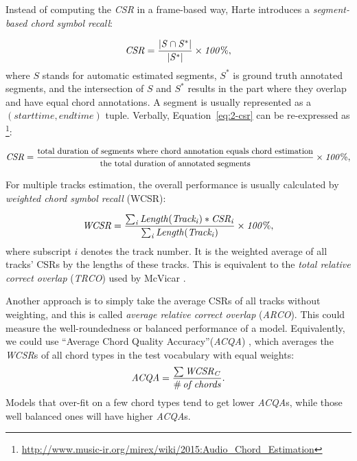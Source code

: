 Instead of computing the \textit{CSR} in a frame-based way, Harte \cite{harte2010towards} introduces a {\it segment-based chord symbol recall}:

\begin{equation}
\mathit{CSR = {|S\cap S^*|\over|S^*|} \times 100\%,}
\label{eq:2-csr}
\end{equation}
where $S$ stands for automatic estimated segments, $S^*$ is ground truth annotated segments, and the intersection of $S$ and $S^*$ results in the part where they overlap and have equal chord annotations. A segment is usually represented as a $(start time, end time)$ tuple. Verbally, Equation~\ref{eq:2-csr} can be re-expressed as \footnote{\url{http://www.music-ir.org/mirex/wiki/2015:Audio\_Chord\_Estimation}}:

\begin{equation}\footnotesize
\mathit{CSR = {\text{total duration of segments where chord annotation equals chord estimation}\over\text{the total duration of annotated segments}} \times 100\%,}
\label{eq:2-csrv}
\end{equation}

For multiple tracks estimation, the overall performance is usually calculated by {\it weighted chord symbol recall} (WCSR):

\begin{equation}
\mathit{WCSR = {\sum_i{Length(Track_i)*CSR_i} \over \sum_i{Length(Track_i)}}\times 100\%,}
\label{eq:2-wcsr}
\end{equation}
where subscript $i$ denotes the track number. It is the weighted average of all tracks' CSRs by the lengths of these tracks. This is equivalent to the {\it total relative correct overlap} (\textit{TRCO}) used by McVicar \cite{mcvicar2013machine}.

Another approach is to simply take the average CSRs of all tracks without weighting, and this is called {\it average relative correct overlap} (\textit{ARCO}). This could measure the well-roundedness or balanced performance of a model. Equivalently, we could use ``Average Chord Quality Accuracy''(\textit{ACQA}) \cite{cho2014improved}, which averages the \textit{WCSR}s of all chord types in the test vocabulary with equal weights:
\begin{equation}
\mathit{ACQA = {{\sum{WCSR_{C}}} \over {\#\,of\,chords}}}.
\label{eq:2-acqa}
\end{equation}
Models that over-fit on a few chord types tend to get lower \textit{ACQA}s, while those well balanced ones will have higher \textit{ACQA}s.

